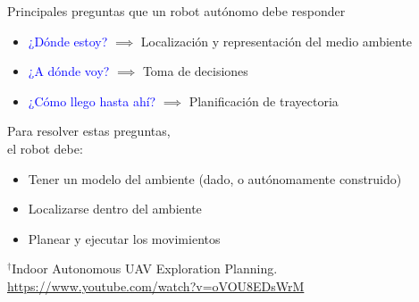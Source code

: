 \documentclass[
  24pt, %
  aspectratio=169, %
]{beamer}
\begin{document}
\begin{frame}  
  Principales preguntas que un robot autónomo debe responder \footnotemark
  \bigskip %
  \begin{itemize}
  \item \textcolor{blue}{¿Dónde estoy?} $\implies$ Localización y representación del medio ambiente \pause 
  \item \textcolor{blue}{¿A dónde voy?} $\implies$ Toma de decisiones \pause  %
  \item \textcolor{blue}{¿Cómo llego hasta ahí?} $\implies$ Planificación de trayectoria 
  \end{itemize}
  \pause
  \bigskip %

  \begin{minipage}{0.47\textwidth}
    Para resolver estas preguntas,\\
    el robot debe: 
    
    \begin{itemize}
    \item Tener un modelo del ambiente (dado, o autónomamente construido)
    \item Localizarse dentro del ambiente
    \item Planear y ejecutar los movimientos
    \end{itemize}
    
  \end{minipage}
  \hspace{0.2cm}
  \begin{minipage}{0.5\textwidth}
    \centering
    \rule{0in}{1.2em}$^\dag$\scriptsize Indoor Autonomous UAV Exploration Planning.\\
    \tiny \url{https://www.youtube.com/watch?v=oVOU8EDsWrM} 
  \end{minipage}
\end{frame}
\end{document}
